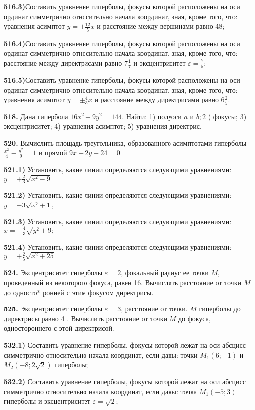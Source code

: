 \textbf{516.3)}Составить уравнение гиперболы, фокусы которой расположены на оси ординат симметрично относительно начала координат, зная, кроме того, что: уравнения асимптот $y= \pm \frac{12}{5} x$ и расстояние между вершинами равно 48;

\textbf{516.4)}Составить уравнение гиперболы, фокусы которой расположены на оси ординат симметрично относительно начала координат, зная, кроме того, что: расстояние между директрисами равно $7 \frac{1}{7}$ и эксцентриситет $\varepsilon=\frac{7}{5}$;

\textbf{516.5)}Составить уравнение гиперболы, фокусы которой расположены на оси ординат симметрично относительно начала координат, зная, кроме того, что: уравнения асимптот $y= \pm \frac{4}{3} x$ и расстояние между директрисами равно $6 \frac{2}{5}$.

\textbf{518.} Дана гипербола $16 x^2-9 y^2=144$. Найти: 1) полуоси $a$ и $b ; 2$ ) фокусы; 3) эксцентриситет; 4) уравнения асимптот; 5) уравнения директрис.

\textbf{520.} Вычислить площадь треугольника, образованного асимптотами гиперболы $\frac{x^2}{4}-\frac{y^2}{9}=1$ и прямой $9 x+2 y-24=0$

\textbf{521.1)} Установить, какие линии определяются следующими уравнениями: $y=+\frac{2}{3} \sqrt{x^2-9}$

\textbf{521.2)} Установить, какие линии определяются следующими уравнениями: $y=-3 \sqrt{x^2+1}$;

\textbf{521.3)} Установить, какие линии определяются следующими уравнениями: $x=-\frac{4}{3} \sqrt{y^2+9} ;$

\textbf{521.4)} Установить, какие линии определяются следующими уравнениями: $y=+\frac{2}{5} \sqrt{x^2+25}$

\textbf{524.} Эксцентриситет гиперболы $\varepsilon=2$, фокальный радиус ее точки $M$, проведенный из некоторого фокуса, равен 16. Вычислить расстояние от точки $M$ до односто* ронней с этим фокусом директрисы.

\textbf{525.} Эксцентриситет гиперболы $\varepsilon=3$, расстояние от точки. $M$ гиперболы до директрисы равно 4 . Вычислить расстояние от точки $M$ до фокуса, одностороннего с этой директрисой.

\textbf{532.1)} Составить уравнение гиперболы, фокусы которой лежат на оси абсцисс симметрично относительно начала координат, если даны: точки $M_1(6 ;-1)$ и $M_2(-8 ; 2 \sqrt{2})$ гиперболы;

\textbf{532.2)} Составить уравнение гиперболы, фокусы которой лежат на оси абсцисс симметрично относительно начала координат, если даны: точка $M_1(-5 ; 3)$ гиперболы и эксцентриситет $\varepsilon=\sqrt{2}$;


